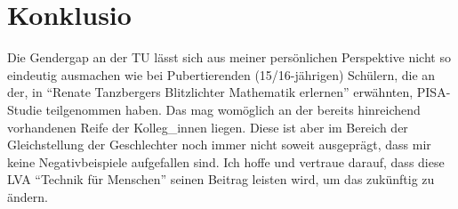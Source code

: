 \documentclass{article}
\begin{document}
\section*{Konklusio}

Die Gendergap an der TU lässt sich aus meiner persönlichen Perspektive nicht so eindeutig ausmachen wie bei Pubertierenden (15/16-jährigen) Schülern, die an der, in \enquote{Renate Tanzbergers Blitzlichter Mathematik erlernen} erwähnten, PISA-Studie teilgenommen haben.
Das mag womöglich an der bereits hinreichend vorhandenen Reife der Kolleg\_innen liegen.
Diese ist aber im Bereich der Gleichstellung der Geschlechter noch immer nicht soweit ausgeprägt, dass mir keine Negativbeispiele aufgefallen sind.
Ich hoffe und vertraue darauf, dass diese LVA \enquote{Technik für Menschen} seinen Beitrag leisten wird, um das zukünftig zu ändern.
\end{document}
